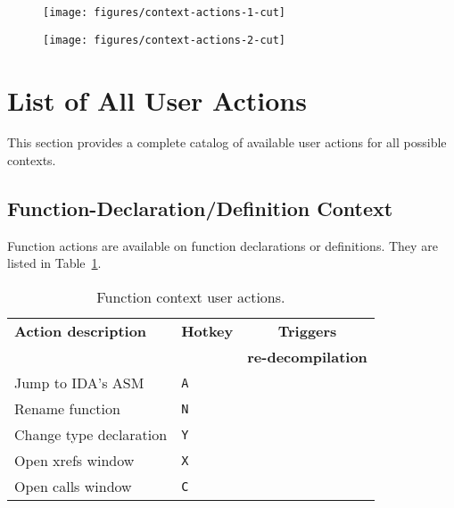 \documentclass[pdftex, a4paper,12pt, oneside, svgnames]{article}
\newcommand{\cmark}{\ding{51}}%
\newcommand{\xmark}{\ding{55}}%
\begin{document}
\begin{figure}
\centering
\begin{minipage}{.5\textwidth}
	\centering
	\texttt{[image: figures/context-actions-1-cut]}
	\label{fig:context-1}
\end{minipage}%
\begin{minipage}{.5\textwidth}
	\centering
	\texttt{[image: figures/context-actions-2-cut]}
	\label{fig:context-2}
\end{minipage}
\end{figure}

\section{List of All User Actions}
\label{sec:all-interaction}
This section provides a complete catalog of available user actions for all possible contexts.

\subsection{Function-Declaration/Definition Context}
\label{sec:context-fnc-def}
Function actions are available on function declarations or definitions. They are listed in Table~\ref{table:function-context}.

\begin{table}[!ht]
\centering
\caption{Function context user actions.}
\label{table:function-context}
\begin{tabular}{llc}
\textbf{Action description} & \textbf{Hotkey} & \textbf{Triggers}\\
& & \textbf{re-decompilation}\\
\hline
Jump to IDA's ASM & \texttt{A} & \xmark \\
Rename function & \texttt{N} & \xmark \\
Change type declaration & \texttt{Y} & \cmark \\
Open xrefs window & \texttt{X} & \xmark \\
Open calls window & \texttt{C} & \xmark \\
\end{tabular}
\end{table}
\end{document}
